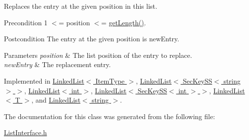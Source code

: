 Replaces the entry at the given position in this list. \begin{DoxyPrecond}{Precondition}
1 $<$= position $<$= \hyperlink{classListInterface_afc85695d4137f1e29ff02e179c9f3221}{get\+Length()}. 
\end{DoxyPrecond}
\begin{DoxyPostcond}{Postcondition}
The entry at the given position is new\+Entry. 
\end{DoxyPostcond}

\begin{DoxyParams}{Parameters}
{\em position} & The list position of the entry to replace. \\
\hline
{\em new\+Entry} & The replacement entry. \\
\hline
\end{DoxyParams}


Implemented in \hyperlink{classLinkedList_a3035f880c50e7d8f68e67c093d4607ca}{Linked\+List$<$ Item\+Type $>$}, \hyperlink{classLinkedList_a3035f880c50e7d8f68e67c093d4607ca}{Linked\+List$<$ Sec\+Key\+S\+S$<$ string $>$ $>$}, \hyperlink{classLinkedList_a3035f880c50e7d8f68e67c093d4607ca}{Linked\+List$<$ int $>$}, \hyperlink{classLinkedList_a3035f880c50e7d8f68e67c093d4607ca}{Linked\+List$<$ Sec\+Key\+S\+S$<$ int $>$ $>$}, \hyperlink{classLinkedList_a3035f880c50e7d8f68e67c093d4607ca}{Linked\+List$<$ T $>$}, and \hyperlink{classLinkedList_a3035f880c50e7d8f68e67c093d4607ca}{Linked\+List$<$ string $>$}.



The documentation for this class was generated from the following file\+:\begin{DoxyCompactItemize}
\item 
\hyperlink{ListInterface_8h}{List\+Interface.\+h}\end{DoxyCompactItemize}
